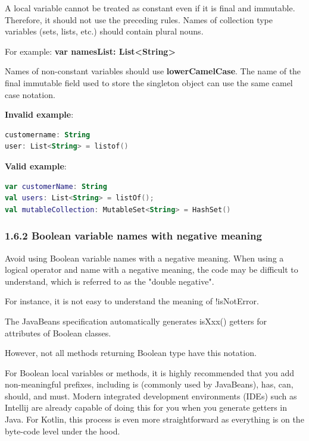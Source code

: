 {{{{{{{{{{{{A local variable cannot be treated as constant even if it is final and immutable. Therefore, it should not use the preceding rules. Names of collection type variables (sets, lists, etc.) should contain plural nouns.

For example: \textbf{var namesList: List<String>}



Names of non-constant variables should use \textbf{lowerCamelCase}. The name of the final immutable field used to store the singleton object can use the same camel case notation.



\textbf{Invalid example}: 

\begin{lstlisting}[language=Kotlin]
customername: String
user: List<String> = listof()
\end{lstlisting}


\textbf{Valid example}: 

\begin{lstlisting}[language=Kotlin]
var customerName: String
val users: List<String> = listOf();
val mutableCollection: MutableSet<String> = HashSet()
\end{lstlisting}


\subsubsection*{\textbf{1.6.2 Boolean variable names with negative meaning}}
\leavevmode\newline

\label{sec:1.6.2}



Avoid using Boolean variable names with a negative meaning. When using a logical operator and name with a negative meaning, the code may be difficult to understand, which is referred to as the "double negative".

For instance, it is not easy to understand the meaning of !isNotError.

The JavaBeans specification automatically generates isXxx() getters for attributes of Boolean classes.

However, not all methods returning Boolean type have this notation.

For Boolean local variables or methods, it is highly recommended that you add non-meaningful prefixes, including is (commonly used by JavaBeans), has, can, should, and must. Modern integrated development environments (IDEs) such as Intellij are already capable of doing this for you when you generate getters in Java. For Kotlin, this process is even more straightforward as everything is on the byte-code level under the hood.



}}}}}}}}}}}}
